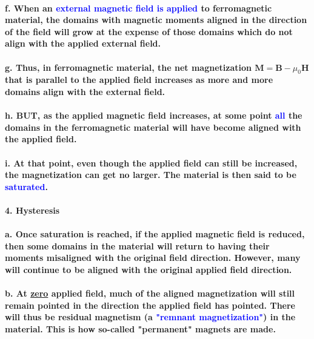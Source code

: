 \documentclass{article}
\begin{document}
\paragraph{\indent f. When an \textcolor{blue}{external magnetic field is applied} to ferromagnetic material, the domains with magnetic moments aligned in the direction of the field will grow at the expense of those domains which do not align with the applied external field.}
\paragraph{\indent g. Thus, in ferromagnetic material, the net magnetization $\boldsymbol{M}=\boldsymbol{B}-\mu_0\boldsymbol{H}$ that is parallel to the applied field increases as more and more domains align with the external field.}
\paragraph{\indent h. BUT, as the applied magnetic field increases, at some point \textcolor{blue}{all} the domains in the ferromagnetic material will have become aligned with the applied field.}
\paragraph{\indent i. At that point, even though the applied field can still be increased, the magnetization can get no larger. The material is then said to be \textcolor{blue}{saturated}.}
\paragraph{4. Hysteresis}
\paragraph{\indent a. Once saturation is reached, if the applied magnetic field is reduced, then some domains in the material will return to having their moments misaligned with the original field direction. However, many will continue to be aligned with the original applied field direction.}
\paragraph{\indent b. At \underline{zero} applied field, much of the aligned magnetization will still remain pointed in the direction the applied field has pointed. There will thus be residual magnetism (a \textcolor{blue}{"remnant magnetization"}) in the material. This is how so-called "permanent" magnets are made.} 
\end{document}
